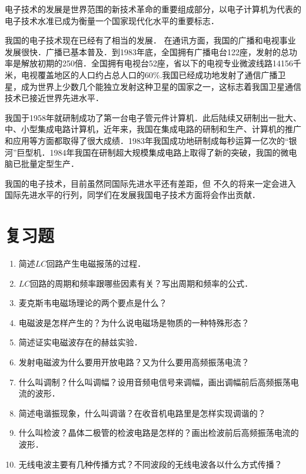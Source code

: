 电子技术的发展是世界范围的新技术革命的重要组成部分，以电子计算机为代表的电子技术水准已成为衡量一个国家现代化水平的重要标志．

我国的电子技术现在已经有了相当的发展．
在通讯方面，我国的广播和电视事业发展很快．广播已基本普及．到1983年底，全国拥有广播电台122座，发射的总功率是解放初期的250倍．全国拥有电视台52座，省以下的电视专业微波线路14156千米，电视覆盖地区的人口约占总人口的60\%.我国已经成功地发射了通信广播卫星，成为世界上少数几个能独立发射这种卫星的国家之一，这标志着我国卫星通信技术已接近世界先进水平．

我国于1958年就研制成功了第一台电子管元件计算机．此后陆续又研制出一批大、中、小型集成电路计算机，近年来，我国在集成电路的研制和生产、计算机的推广和应用等方面都取得了很大成绩．1983年我国成功地研制成每秒运算一亿次的“银河”巨型机．1984年我国在研制超大规模集成电路上取得了新的突破，我国的微电脑已批量定型生产．

我国的电子技术，目前虽然同国际先进水平还有差距，但
不久的将来一定会进入国际先进水平的行列，同学们在发展我国电子技术方面将会作出贡献．

\section*{复习题}
\begin{enumerate}
	\item 简述$LC$回路产生电磁报荡的过程．
	\item $LC$回路的周期和频率跟哪些因素有关？写出周期和频率的公式．
	\item 麦克斯韦电磁场理论的两个要点是什么？
	\item 电磁波是怎样产生的？为什么说电磁场是物质的一种特殊形态？
	\item 简述证实电磁波存在的赫兹实验．
	\item 发射电磁波为什么要用开放电路？又为什么要用高频振荡电流？
	\item 什么叫调制？什么叫调幅？设用音频电信号来调幅，画出调幅前后高频振荡电流的波形．
	\item 简述电谐振现象，什么叫调谐？在收音机电路里是怎样实现调谐的？
	\item 什么叫检波？晶体二极管的检波电路是怎样的？画出检波前后高频振荡电流的波形．
	\item 无线电波主要有几种传播方式？不同波段的无线电波各以什么方式传播？
\end{enumerate}

